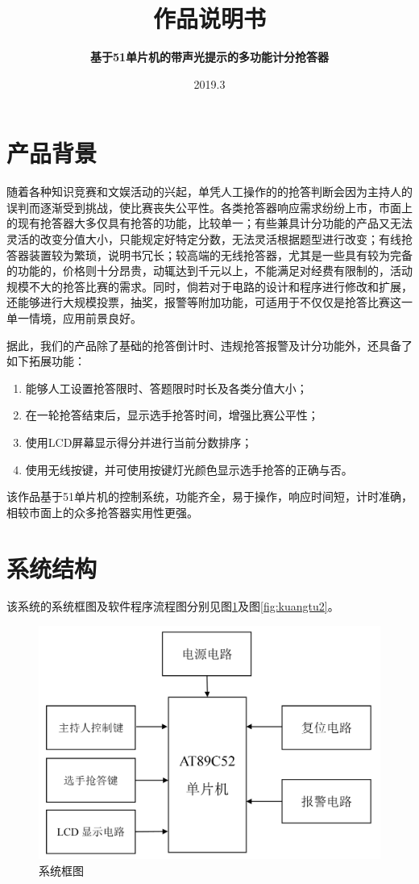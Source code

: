 \documentclass[12pt]{article}
\date{}
\title{\zihao{2}\textbf{作品说明书}}
\author{\zihao{3}\textbf{基于51单片机的带声光提示的多功能计分抢答器}}
\date{\zihao{3}2019.3}
\begin{document}

\renewcommand{\contentsname}{\centering 目录}
\renewcommand{\tablename}{表}
\renewcommand{\figurename}{图}
\renewcommand\refname{参考文献}
\renewcommand\appendix{\setcounter{secnumdepth}{0}}
\renewcommand\abstractname{摘要}

\maketitle
{}
\section{产品背景}
随着各种知识竞赛和文娱活动的兴起，单凭人工操作的的抢答判断会因为主持人的误判而逐渐受到挑战，使比赛丧失公平性。各类抢答器响应需求纷纷上市，市面上的现有抢答器大多仅具有抢答的功能，比较单一；有些兼具计分功能的产品又无法灵活的改变分值大小，只能规定好特定分数，无法灵活根据题型进行改变；有线抢答器装置较为繁琐，说明书冗长；较高端的无线抢答器，尤其是一些具有较为完备的功能的，价格则十分昂贵，动辄达到千元以上，不能满足对经费有限制的，活动规模不大的抢答比赛的需求。同时，倘若对于电路的设计和程序进行修改和扩展，还能够进行大规模投票，抽奖，报警等附加功能，可适用于不仅仅是抢答比赛这一单一情境，应用前景良好。

据此，我们的产品除了基础的抢答倒计时、违规抢答报警及计分功能外，还具备了如下拓展功能：
\begin{enumerate}
  \item 能够人工设置抢答限时、答题限时时长及各类分值大小；
  \item 在一轮抢答结束后，显示选手抢答时间，增强比赛公平性；
  \item 使用LCD屏幕显示得分并进行当前分数排序；
  \item 使用无线按键，并可使用按键灯光颜色显示选手抢答的正确与否。
\end{enumerate}

该作品基于51单片机的控制系统，功能齐全，易于操作，响应时间短，计时准确，相较市面上的众多抢答器实用性更强。

\section{系统结构}
该系统的系统框图及软件程序流程图分别见图\ref{fig:kuangtu}及图\ref{fig:kuangtu2}。
\begin{figure}[h]
	\centering
	\includegraphics[width=0.8\linewidth]{picture/01.jpg}
	\caption{系统框图}
	\label{fig:kuangtu}
\end{figure}
\end{document}
